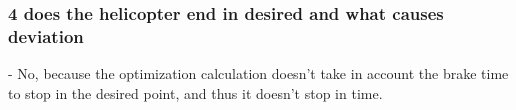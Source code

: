 \subsubsection{4 does the helicopter end in desired and what causes deviation}
- No, because the optimization calculation doesn't take in account the brake time to stop in the desired point, and thus it doesn't stop in time.

